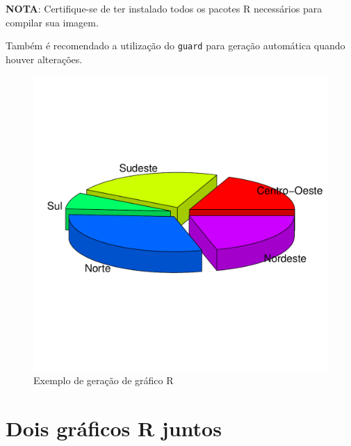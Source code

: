 \documentclass[
	12pt,				%
	oneside,			%
	a4paper,			%
	english,			%
	french,				%
	spanish,			%
	brazil				%
	]{abntex2}
\begin{document}
\textbf{NOTA}: Certifique-se de ter instalado todos os pacotes R
necessários para compilar sua imagem.

Também é recomendado a utilização do \texttt{guard} para geração
automática quando houver alterações.

\begin{figure}[htbp]
\hypertarget{pizza}{%
\caption{Exemplo de geração de gráfico R}\label{pizza}
\begin{center}
\includegraphics[scale=0.4]{imagens/R/pizza-grafico.pdf}
\end{center}
}
\end{figure}

\hypertarget{dois-gruxe1ficos-r-juntos}{%
\chapter{Dois gráficos R juntos}\label{dois-gruxe1ficos-r-juntos}}
\end{document}
